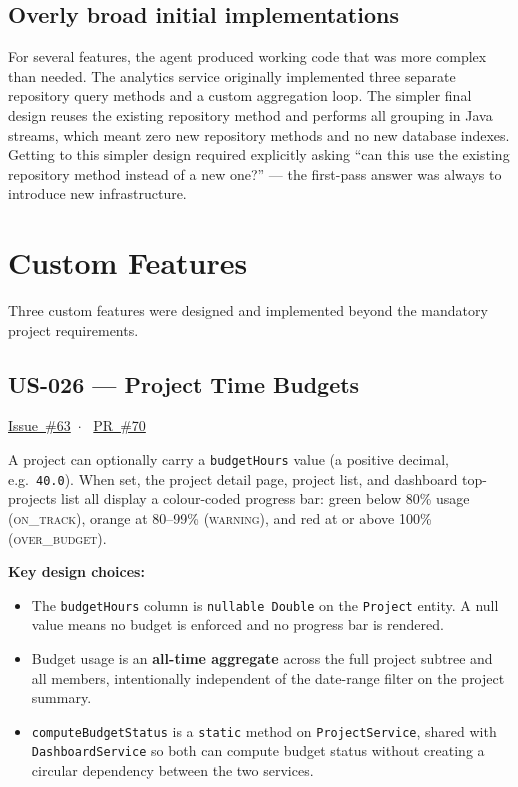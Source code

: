 \documentclass[a4paper, 12pt]{article}
\begin{document}
\subsection{Overly broad initial implementations}

For several features, the agent produced working code that was more complex than needed. The
analytics service originally implemented three separate repository query methods and a custom
aggregation loop. The simpler final design reuses the existing repository method and performs
all grouping in Java streams, which meant zero new repository methods and no new database
indexes. Getting to this simpler design required explicitly asking ``can this use the existing
repository method instead of a new one?'' --- the first-pass answer was always to introduce
new infrastructure.

\section{Custom Features}
\label{sec:custom}

Three custom features were designed and implemented beyond the mandatory project requirements.

\subsection{US-026 --- Project Time Budgets}

\href{https://github.com/se2p-classrooms/final-project-AliAkbarBaloch/issues/63}{Issue~\#63}~$\cdot$~%
\href{https://github.com/se2p-classrooms/final-project-AliAkbarBaloch/pull/70}{PR~\#70}

A project can optionally carry a \texttt{budgetHours} value (a positive decimal,
e.g.\ \texttt{40.0}). When set, the project detail page, project list, and dashboard
top-projects list all display a colour-coded progress bar: green below 80\% usage
(\textsc{on\_track}), orange at 80--99\% (\textsc{warning}), and red at or above 100\%
(\textsc{over\_budget}).

\textbf{Key design choices:}
\begin{itemize}
  \item The \texttt{budgetHours} column is \texttt{nullable Double} on the \texttt{Project}
        entity. A null value means no budget is enforced and no progress bar is rendered.
  \item Budget usage is an \textbf{all-time aggregate} across the full project subtree and
        all members, intentionally independent of the date-range filter on the project
        summary.
  \item \texttt{computeBudgetStatus} is a \texttt{static} method on \texttt{ProjectService},
        shared with \texttt{DashboardService} so both can compute budget status without
        creating a circular dependency between the two services.
\end{itemize}
\end{document}
